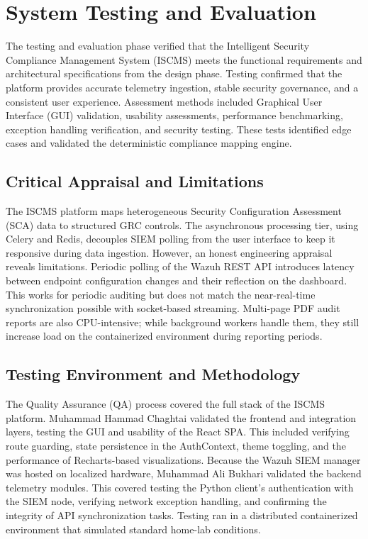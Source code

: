 \chapter{System Testing and Evaluation}
The testing and evaluation phase verified that the Intelligent Security Compliance Management System (ISCMS) meets the functional requirements and architectural specifications from the design phase. Testing confirmed that the platform provides accurate telemetry ingestion, stable security governance, and a consistent user experience. Assessment methods included Graphical User Interface (GUI) validation, usability assessments, performance benchmarking, exception handling verification, and security testing. These tests identified edge cases and validated the deterministic compliance mapping engine.

\section{Critical Appraisal and Limitations}
The ISCMS platform maps heterogeneous Security Configuration Assessment (SCA) data to structured GRC controls. The asynchronous processing tier, using Celery and Redis, decouples SIEM polling from the user interface to keep it responsive during data ingestion. However, an honest engineering appraisal reveals limitations. Periodic polling of the Wazuh REST API introduces latency between endpoint configuration changes and their reflection on the dashboard. This works for periodic auditing but does not match the near-real-time synchronization possible with socket-based streaming. Multi-page PDF audit reports are also CPU-intensive; while background workers handle them, they still increase load on the containerized environment during reporting periods.

\section{Testing Environment and Methodology}
The Quality Assurance (QA) process covered the full stack of the ISCMS platform. Muhammad Hammad Chaghtai validated the frontend and integration layers, testing the GUI and usability of the React SPA. This included verifying route guarding, state persistence in the AuthContext, theme toggling, and the performance of Recharts-based visualizations. Because the Wazuh SIEM manager was hosted on localized hardware, Muhammad Ali Bukhari validated the backend telemetry modules. This covered testing the Python client's authentication with the SIEM node, verifying network exception handling, and confirming the integrity of API synchronization tasks. Testing ran in a distributed containerized environment that simulated standard home-lab conditions.


